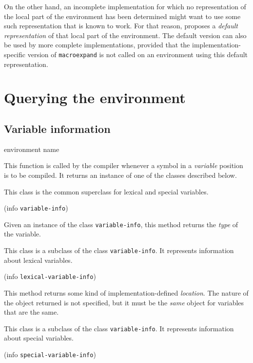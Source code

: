 On the other hand, an incomplete implementation for which no
representation of the local part of the environment has been
determined might want to use some such representation that is known to
work.  For that reason, \sysname{} proposes a \emph{default
  representation} of that local part of the environment.  The default
version can also be used by more complete implementations, provided
that the implementation-specific version of \texttt{macroexpand} is
not called on an environment using this default representation. 

\section{Querying the environment}

\subsection{Variable information}

 {environment name}

This function is called by the compiler whenever a symbol in a
\emph{variable} position is to be compiled.  It returns an instance of
one of the classes described below.


This class is the common superclass for lexical and special
variables. 

 {(info {\tt variable-info})}

Given an instance of the class \texttt{variable-info}, this method
returns the \emph{type} of the variable. 


This class is a subclass of the class \texttt{variable-info}.  It
represents information about lexical variables. 

 {(info {\tt lexical-variable-info})}

This method returns some kind of implementation-defined
\emph{location}.  The nature of the object returned is not specified,
but it must be the \emph{same} object for variables that are the
same. 


This class is a subclass of the class \texttt{variable-info}.  It
represents information about special variables. 

 {(info {\tt special-variable-info})}

